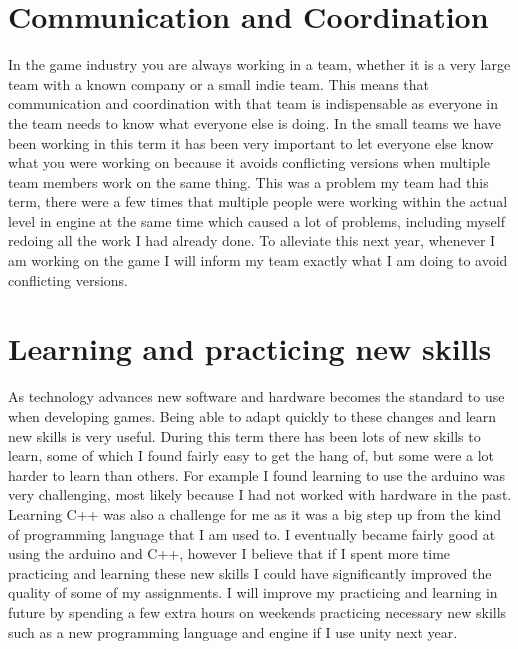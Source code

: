 \documentclass{scrartcl}
\begin{document}
\section{Communication and Coordination}
In the game industry you are always working in a team, whether it is a very large team with a known company or a small indie team. This means that communication and coordination with that team is indispensable as everyone in the team needs to know what everyone else is doing. In the small teams we have been working in this term it has been very important to let everyone else know what you were working on because it avoids conflicting versions when multiple team members work on the same thing. This was a problem my team had this term, there were a few times that multiple people were working within the actual level in engine at the same time which caused a lot of problems, including myself redoing all the work I had already done. To alleviate this next year, whenever I am working on the game I will inform my team exactly what I am doing to avoid conflicting versions.  

\section{Learning and practicing new skills}
As technology advances new software and hardware becomes the standard to use when developing games. Being able to adapt quickly to these changes and learn new skills is very useful. During this term there has been lots of new skills to learn, some of which I found fairly easy to get the hang of, but some were a lot harder to learn than others. For example I found learning to use the arduino was very challenging, most likely because I had not worked with hardware in the past. Learning C++ was also a challenge for me as it was a big step up from the kind of programming language that I am used to. I eventually became fairly good at using the arduino and C++, however I believe that if I spent more time practicing and learning these new skills I could have significantly improved the quality of some of my assignments. I will improve my practicing and learning in future by spending a few extra hours on weekends practicing necessary new skills such as a new programming language and engine if I use unity next year.  
\end{document}
